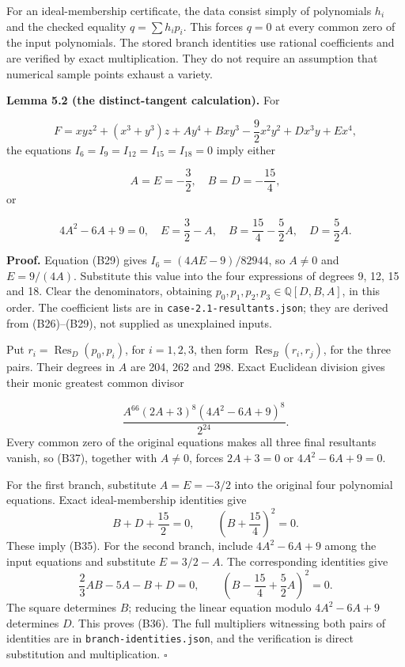 \documentclass[
]{article}
\begin{document}
For an ideal-membership certificate, the data consist simply of
polynomials \(h_i\) and the checked equality \(q=\sum h_ip_i\). This
forces \(q=0\) at every common zero of the input polynomials. The stored
branch identities use rational coefficients and are verified by exact
multiplication. They do not require an assumption that numerical sample
points exhaust a variety.

\protect{}\label{lemma-5-2}{}

\textbf{Lemma 5.2 (the distinct-tangent calculation).} For
\protect{}\label{equation-B34}{}

\[
F=xyz^2+(x^3+y^3)z+Ay^4+Bxy^3-\frac92x^2y^2+Dx^3y+Ex^4,
\tag{B34}
\] the equations \(I_6=I_9=I_{12}=I_{15}=I_{18}=0\) imply either
\protect{}\label{equation-B35}{}

\[
A=E=-\frac32,\quad B=D=-\frac{15}{4},
\tag{B35}
\] or \protect{}\label{equation-B36}{}

\[
4A^2-6A+9=0,\quad E=\frac32-A,\quad
B=\frac{15}{4}-\frac52A,\quad D=\frac52A.
\tag{B36}
\]

\textbf{Proof.} Equation (B29) gives \(I_6=(4AE-9)/82944\), so \(A\ne0\)
and \(E=9/(4A)\). Substitute this value into the four expressions of
degrees 9, 12, 15 and 18. Clear the denominators, obtaining
\(p_0,p_1,p_2,p_3\in\mathbb Q [D,B,A]\), in this order. The coefficient
lists are in \texttt{case-2.1-resultants.json}; they are derived from
(B26)--(B29), not supplied as unexplained inputs.

Put \(r_i=\operatorname{Res}_D(p_0,p_i)\), for \(i=1,2,3\), then form
\(\operatorname{Res}_B(r_i,r_j)\), for the three pairs. Their degrees in
\(A\) are 204, 262 and 298. Exact Euclidean division gives their monic
greatest common divisor \protect{}\label{equation-B37}{}

\[
\frac{A^{66}(2A+3)^8(4A^2-6A+9)^8}{2^{24}}.
\tag{B37}
\] Every common zero of the original equations makes all three final
resultants vanish, so (B37), together with \(A\ne0\), forces \(2A+3=0\)
or \(4A^2-6A+9=0\).

For the first branch, substitute \(A=E=-3/2\) into the original four
polynomial equations. Exact ideal-membership identities give \[
B+D+\frac{15}{2}=0,\qquad
\left(B+\frac{15}{4}\right)^2=0.
\] These imply (B35). For the second branch, include \(4A^2-6A+9\) among
the input equations and substitute \(E=3/2-A\). The corresponding
identities give \[
\frac23AB-5A-B+D=0,\qquad
\left(B-\frac{15}{4}+\frac52A\right)^2=0.
\] The square determines \(B\); reducing the linear equation modulo
\(4A^2-6A+9\) determines \(D\). This proves (B36). The full multipliers
witnessing both pairs of identities are in
\texttt{branch-identities.json}, and the verification is direct
substitution and multiplication. \(\square\)
\end{document}
